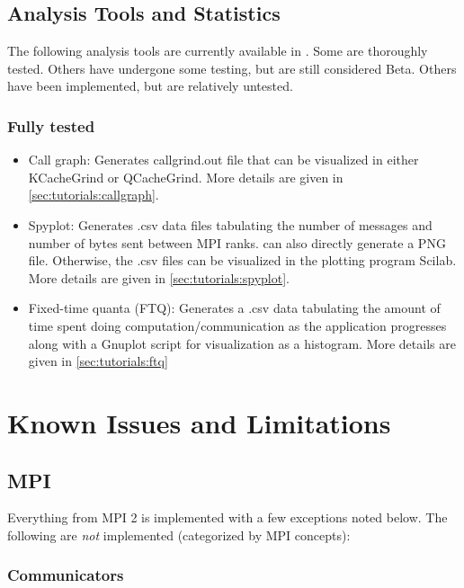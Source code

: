 \subsection{Analysis Tools and Statistics}
\label{subsec:intro:toolsandstats}
The following analysis tools are currently available in \sstmacro.
Some are thoroughly tested. Others have undergone some testing, but are still considered Beta.  Others have been implemented, but are relatively untested.

\subsubsection{Fully tested}
\label{subsubsec:intro:fulltestedtools}
\begin{itemize}
\item Call graph: Generates callgrind.out file that can be visualized in either KCacheGrind or QCacheGrind. More details are given in \ref{sec:tutorials:callgraph}.
\item Spyplot: Generates .csv data files tabulating the number of messages and number of bytes sent between MPI ranks. \sstmacro can also directly generate a PNG file. Otherwise, the .csv files can be visualized in the plotting program Scilab. More details are given in \ref{sec:tutorials:spyplot}.
\item Fixed-time quanta (FTQ): Generates a .csv data tabulating the amount of time spent doing computation/communication as the application progresses along with a Gnuplot script for visualization as a histogram. More details are given in \ref{sec:tutorials:ftq}
\end{itemize}

\section{Known Issues and Limitations}
\label{sec:intro:issues}

\subsection{MPI}
\label{subsec:issues:mpi}

Everything from MPI 2 is implemented with a few exceptions noted below.  
The following are \textit{not} implemented (categorized by MPI concepts):

\subsubsection{Communicators}
\label{subsubsec:issues:mpi:comm}

